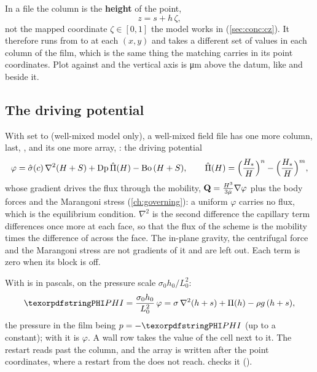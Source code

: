 In a  file the  column is the \textbf{height} of the point,
\begin{equation*}
  z = s + h\,\zeta ,
\end{equation*}
not the mapped coordinate $\zeta \in [0,1]$ the model works in
(\cref{sec:conc:cz}). It therefore runs from  to  at each
$(x,y)$ and takes a different set of values in each column of the film, which
is the same thing the matching  carries in its point
coordinates. Plot  against  and the vertical axis is
\si{\micro\metre} above the datum, like  and  beside it.

\subsection{The driving potential}
\label{sec:output:potential}

With  set to  (well-mixed
model only), a well-mixed field file has one more column, last, ,
and its  one more array, : the driving potential
\begin{equation*}
  \varphi = \hat\sigma(c)\,\nabla^2(H+S) + \mathrm{Dp}\,\hat{\Pi}(H) - \mathrm{Bo}\,(H+S),
  \qquad \hat{\Pi}(H) = \Bigl(\frac{H_*}{H}\Bigr)^{n} - \Bigl(\frac{H_*}{H}\Bigr)^{m},
\end{equation*}
whose gradient drives the flux through the mobility, $\mathbf{Q} =
\tfrac{H^3}{3\hat\mu}\nabla\varphi$ plus the body forces and the Marangoni
stress (\cref{ch:governing}): a uniform $\varphi$ carries no flux, which is
the equilibrium condition. $\nabla^2$ is the second difference the capillary
term differences once more at each face, so that the flux of the scheme is
the mobility times the difference of  across the face. The in-plane
gravity, the centrifugal force and the Marangoni stress are not gradients of
it and are left out. Each term is zero when its  block is off.

With    is in pascals, on the
pressure scale $\sigma_0 h_0/L_0^2$:
\begin{equation*}
  \code{PHI} = \frac{\sigma_0 h_0}{L_0^2}\,\varphi
  = \sigma\,\nabla^2(h+s) + \Pi(h) - \rho g\,(h+s),
\end{equation*}
the pressure in the film being $p = -\code{PHI}$ (up to a constant); with
 it is $\varphi$. A wall row takes the value of the cell next to
it. The restart reads past the column, and the  array is
written after the point coordinates, where a restart from the 
does not reach.  checks it ().

